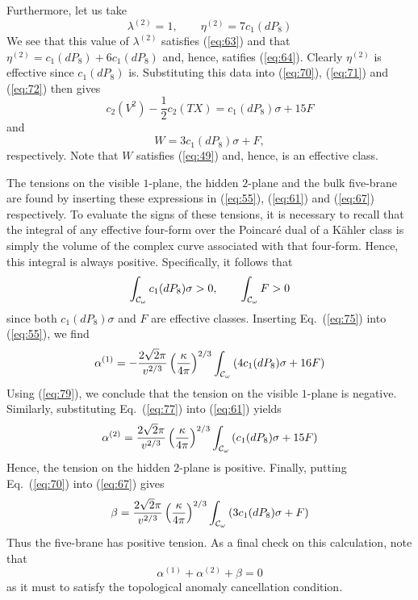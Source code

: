\documentclass[a4paper,12pt]{article}
\numberwithin{equation}{section}
\theoremstyle{plain}
\begin{document}
Furthermore, let us take
%
\begin{equation}
\lambda^{(2)}=1, \qquad \eta^{(2)}=7c_{1}(dP_{8})
\label{eq:76}
\end{equation}
%
We see that this value of $\lambda^{(2)}$ satisfies (\ref{eq:63}) and that
$\eta^{(2)}=c_{1}(dP_{8})+6c_{1}(dP_{8})$ and, hence, satifies (\ref{eq:64}).
Clearly $\eta^{(2)}$ is effective since $c_{1}(dP_{8})$ is. Substituting this
data into (\ref{eq:70}), (\ref{eq:71}) and (\ref{eq:72}) then gives
%
\begin{equation}
c_{2}(V^{2})-\frac{1}{2}c_{2}(TX)=c_{1}(dP_{8})\sigma+15F
\label{eq:77}
\end{equation}
%
and
%
\begin{equation}
W=3c_{1}(dP_{8})\sigma+F,
\label{eq:78}
\end{equation}
%
respectively. Note that $W$ satisfies (\ref{eq:49}) and, hence, is an
effective class.

The tensions on the visible $1$-plane, the hidden
$2$-plane and the bulk five-brane are found by inserting these expressions in 
(\ref{eq:55}), (\ref{eq:61}) and (\ref{eq:67}) respectively. To evaluate the
signs of these tensions, it is necessary to recall that the integral of any 
effective four-form over the Poincar\'e dual of a K\"{a}hler class is simply the
volume of the complex curve associated with that four-form. Hence, this
integral is always positive. Specifically, it follows that
%
\begin{equation}
\int_{{\cal{C}}_{\omega}}{c_{1}(dP_{8})\sigma}>0, \qquad 
\int_{{\cal{C}}_{\omega}}{F}>0
\label{eq:79}
\end{equation}
%
since both $c_{1}(dP_{8})\sigma$ and $F$ are effective classes. Inserting
Eq.~(\ref{eq:75}) into (\ref{eq:55}), we find 
%
\begin{equation}
\alpha^{(1)}=-\frac{2\sqrt{2}\pi}{v^{2/3}}\left(\frac{\kappa}{4\pi}\right)^{2/3}
\int_{{\cal{C}}_{\omega}}{(4c_{1}(dP_{8})\sigma +16F)}
\label{eq:80}
\end{equation}
%
Using (\ref{eq:79}), we conclude that the tension on the visible 
$1$-plane is negative. Similarly, substituting Eq.~(\ref{eq:77}) 
into (\ref{eq:61}) yields
%
\begin{equation}
\alpha^{(2)}=\frac{2\sqrt{2}\pi}{v^{2/3}}\left(\frac{\kappa}{4\pi}\right)^{2/3}
\int_{{\cal{C}}_{\omega}}{(c_{1}(dP_{8})\sigma +15F)}
\label{eq:81}
\end{equation}
%
Hence, the tension on the hidden $2$-plane is positive. Finally,
putting Eq.~(\ref{eq:70}) into (\ref{eq:67}) gives
%
\begin{equation}
\beta=\frac{2\sqrt{2}\pi}{v^{2/3}}\left(\frac{\kappa}{4\pi}\right)^{2/3}
\int_{{\cal{C}}_{\omega}}{(3c_{1}(dP_{8})\sigma+F)}
\label{eq:82}
\end{equation}
%
Thus the five-brane has positive tension. As a final check on this
calculation, note that 
%
\begin{equation}
\alpha^{(1)}+\alpha^{(2)}+ \beta=0
\label{eq:83}
\end{equation}
%
as it must to satisfy the topological anomaly cancellation condition.
\end{document}
